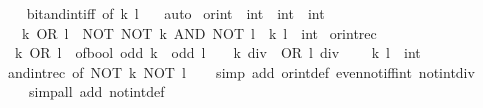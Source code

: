 \begin{isabellebody}
%
\isadelimproof
\ \ %
\endisadelimproof
%
\isatagproof
{}\isamarkupfalse%
\ bit{\isacharunderscore}{\kern0pt}and{\isacharunderscore}{\kern0pt}int{\isacharunderscore}{\kern0pt}iff\ {\isacharbrackleft}{\kern0pt}of\ k\ l\ {}{\isacharbrackright}{\kern0pt}\ \isamarkupfalse%
\ auto%
\endisatagproof
{\isafoldproof}%
%
\isadelimproof
\isanewline
%
\endisadelimproof
\isanewline
{}\isamarkupfalse%
\ or{\isacharunderscore}{\kern0pt}int\ {\isacharcolon}{\kern0pt}{\isacharcolon}{\kern0pt}\ {\isacartoucheopen}int\ {\isasymRightarrow}\ int\ {\isasymRightarrow}\ int{\isacartoucheclose}\isanewline
\ \ \ {\isacartoucheopen}k\ OR\ l\ {\isacharequal}{\kern0pt}\ NOT\ {\isacharparenleft}{\kern0pt}NOT\ k\ AND\ NOT\ l{\isacharparenright}{\kern0pt}{\isacartoucheclose}\ \ k\ l\ {\isacharcolon}{\kern0pt}{\isacharcolon}{\kern0pt}\ int\isanewline
\isanewline
{}\isamarkupfalse%
\ or{\isacharunderscore}{\kern0pt}int{\isacharunderscore}{\kern0pt}rec{\isacharcolon}{\kern0pt}\isanewline
\ \ {\isacartoucheopen}k\ OR\ l\ {\isacharequal}{\kern0pt}\ of{\isacharunderscore}{\kern0pt}bool\ {\isacharparenleft}{\kern0pt}odd\ k\ {\isasymor}\ odd\ l{\isacharparenright}{\kern0pt}\ {\isacharplus}{\kern0pt}\ {}\ {\isacharasterisk}{\kern0pt}\ {\isacharparenleft}{\kern0pt}{\isacharparenleft}{\kern0pt}k\ div\ {}{\isacharparenright}{\kern0pt}\ OR\ {\isacharparenleft}{\kern0pt}l\ div\ {}{\isacharparenright}{\kern0pt}{\isacharparenright}{\kern0pt}{\isacartoucheclose}\isanewline
\ \ \ k\ l\ {\isacharcolon}{\kern0pt}{\isacharcolon}{\kern0pt}\ int\isanewline
%
\isadelimproof
\ \ %
\endisadelimproof
%
\isatagproof
{}\isamarkupfalse%
\ and{\isacharunderscore}{\kern0pt}int{\isacharunderscore}{\kern0pt}rec\ {\isacharbrackleft}{\kern0pt}of\ {\isacartoucheopen}NOT\ k{\isacartoucheclose}\ {\isacartoucheopen}NOT\ l{\isacartoucheclose}{\isacharbrackright}{\kern0pt}\isanewline
\ \ \isamarkupfalse%
\ {\isacharparenleft}{\kern0pt}simp\ add{\isacharcolon}{\kern0pt}\ or{\isacharunderscore}{\kern0pt}int{\isacharunderscore}{\kern0pt}def\ even{\isacharunderscore}{\kern0pt}not{\isacharunderscore}{\kern0pt}iff{\isacharunderscore}{\kern0pt}int\ not{\isacharunderscore}{\kern0pt}int{\isacharunderscore}{\kern0pt}div{\isacharunderscore}{\kern0pt}{}{\isacharparenright}{\kern0pt}\isanewline
\ \ \ \ {\isacharparenleft}{\kern0pt}simp{\isacharunderscore}{\kern0pt}all\ add{\isacharcolon}{\kern0pt}\ not{\isacharunderscore}{\kern0pt}int{\isacharunderscore}{\kern0pt}def{\isacharparenright}{\kern0pt}%

\end{isabellebody}
